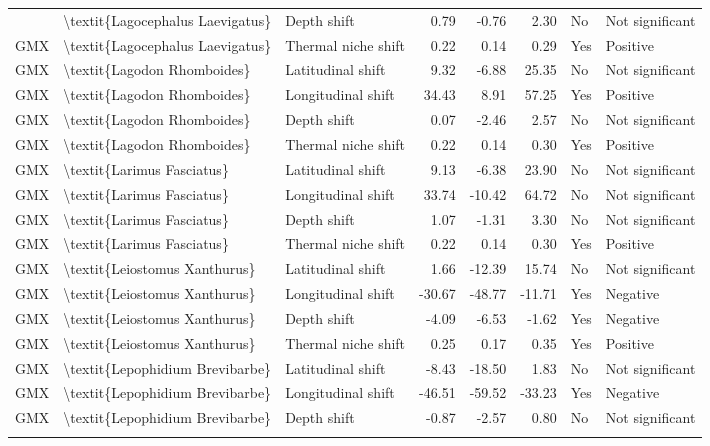 \begin{longtable}[t]{lllrrrll}
{{GMX & \textbackslash{}textit\{Lagocephalus Laevigatus\} & Depth shift & 0.79 & -0.76 & 2.30 & No & Not significant\\
\addlinespace
GMX & \textbackslash{}textit\{Lagocephalus Laevigatus\} & Thermal niche shift & 0.22 & 0.14 & 0.29 & Yes & Positive\\
GMX & \textbackslash{}textit\{Lagodon Rhomboides\} & Latitudinal shift & 9.32 & -6.88 & 25.35 & No & Not significant\\
GMX & \textbackslash{}textit\{Lagodon Rhomboides\} & Longitudinal shift & 34.43 & 8.91 & 57.25 & Yes & Positive\\
GMX & \textbackslash{}textit\{Lagodon Rhomboides\} & Depth shift & 0.07 & -2.46 & 2.57 & No & Not significant\\
GMX & \textbackslash{}textit\{Lagodon Rhomboides\} & Thermal niche shift & 0.22 & 0.14 & 0.30 & Yes & Positive\\
\addlinespace
GMX & \textbackslash{}textit\{Larimus Fasciatus\} & Latitudinal shift & 9.13 & -6.38 & 23.90 & No & Not significant\\
GMX & \textbackslash{}textit\{Larimus Fasciatus\} & Longitudinal shift & 33.74 & -10.42 & 64.72 & No & Not significant\\
GMX & \textbackslash{}textit\{Larimus Fasciatus\} & Depth shift & 1.07 & -1.31 & 3.30 & No & Not significant\\
GMX & \textbackslash{}textit\{Larimus Fasciatus\} & Thermal niche shift & 0.22 & 0.14 & 0.30 & Yes & Positive\\
GMX & \textbackslash{}textit\{Leiostomus Xanthurus\} & Latitudinal shift & 1.66 & -12.39 & 15.74 & No & Not significant\\
\addlinespace
GMX & \textbackslash{}textit\{Leiostomus Xanthurus\} & Longitudinal shift & -30.67 & -48.77 & -11.71 & Yes & Negative\\
GMX & \textbackslash{}textit\{Leiostomus Xanthurus\} & Depth shift & -4.09 & -6.53 & -1.62 & Yes & Negative\\
GMX & \textbackslash{}textit\{Leiostomus Xanthurus\} & Thermal niche shift & 0.25 & 0.17 & 0.35 & Yes & Positive\\
GMX & \textbackslash{}textit\{Lepophidium Brevibarbe\} & Latitudinal shift & -8.43 & -18.50 & 1.83 & No & Not significant\\
GMX & \textbackslash{}textit\{Lepophidium Brevibarbe\} & Longitudinal shift & -46.51 & -59.52 & -33.23 & Yes & Negative\\
\addlinespace
GMX & \textbackslash{}textit\{Lepophidium Brevibarbe\} & Depth shift & -0.87 & -2.57 & 0.80 & No & Not significant\\
}}
\end{longtable}
